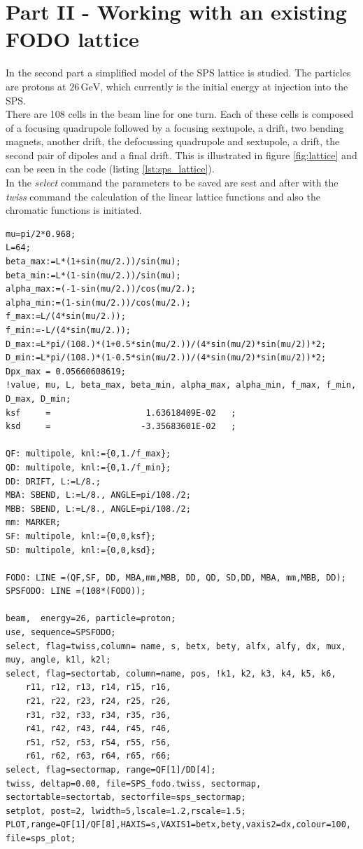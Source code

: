 \section{Part II - Working with an existing FODO lattice}
In the second part a simplified model of the SPS lattice is studied. The particles are protons at $26\,\mathrm{GeV}$, which currently is the initial energy at injection into the SPS.\\
There are 108 cells in the beam line for one turn. Each of these cells is composed of a focusing quadrupole followed by a focusing sextupole, a drift, two bending magnets, another drift, the defocussing quadrupole and sextupole, a drift, the second pair of dipoles and a final drift. This is illustrated in figure \ref{fig:lattice} and can be seen in the code (listing \ref{lst:sps_lattice}).\\
In the \textit{select} command the parameters to be saved are sest and after with the \textit{twiss} command the calculation of the linear lattice functions and also the chromatic functions is initiated.
\begin{lstlisting}[caption={Definition of SPS lattice}, label={lst:sps_lattice},breaklines=true]
mu=pi/2*0.968;
L=64;
beta_max:=L*(1+sin(mu/2.))/sin(mu);
beta_min:=L*(1-sin(mu/2.))/sin(mu);
alpha_max:=(-1-sin(mu/2.))/cos(mu/2.);
alpha_min:=(1-sin(mu/2.))/cos(mu/2.);
f_max:=L/(4*sin(mu/2.));
f_min:=-L/(4*sin(mu/2.));
D_max:=L*pi/(108.)*(1+0.5*sin(mu/2.))/(4*sin(mu/2)*sin(mu/2))*2;
D_min:=L*pi/(108.)*(1-0.5*sin(mu/2.))/(4*sin(mu/2)*sin(mu/2))*2;
Dpx_max = 0.05660608619;
!value, mu, L, beta_max, beta_min, alpha_max, alpha_min, f_max, f_min, D_max, D_min;
ksf     =                   1.63618409E-02   ;
ksd     =                  -3.35683601E-02   ;

QF: multipole, knl:={0,1./f_max};
QD: multipole, knl:={0,1./f_min};
DD: DRIFT, L:=L/8.;
MBA: SBEND, L:=L/8., ANGLE=pi/108./2;
MBB: SBEND, L:=L/8., ANGLE=pi/108./2;
mm: MARKER;
SF: multipole, knl:={0,0,ksf};
SD: multipole, knl:={0,0,ksd};

FODO: LINE =(QF,SF, DD, MBA,mm,MBB, DD, QD, SD,DD, MBA, mm,MBB, DD);
SPSFODO: LINE =(108*(FODO));

beam,  energy=26, particle=proton;
use, sequence=SPSFODO;
select, flag=twiss,column= name, s, betx, bety, alfx, alfy, dx, mux, muy, angle, k1l, k2l;
select, flag=sectortab, column=name, pos, !k1, k2, k3, k4, k5, k6,
	r11, r12, r13, r14, r15, r16, 
	r21, r22, r23, r24, r25, r26,
	r31, r32, r33, r34, r35, r36,
	r41, r42, r43, r44, r45, r46,
	r51, r52, r53, r54, r55, r56,
	r61, r62, r63, r64, r65, r66;
select, flag=sectormap, range=QF[1]/DD[4];
twiss, deltap=0.00, file=SPS_fodo.twiss, sectormap, sectortable=sectortab, sectorfile=sps_sectormap;
setplot, post=2, lwidth=5,lscale=1.2,rscale=1.5;
PLOT,range=QF[1]/QF[8],HAXIS=s,VAXIS1=betx,bety,vaxis2=dx,colour=100, file=sps_plot;
\end{lstlisting}
